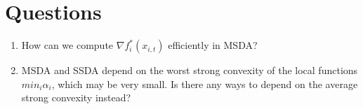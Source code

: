 \documentclass[12pt]{article}
\begin{document}
\section{Questions}
\begin{enumerate}
    \item How can we compute $\nabla f_{i}^{*}\left(x_{i, t}\right)$ efficiently in MSDA?
    \item MSDA and SSDA depend on the worst strong convexity of the local functions $min_i \alpha_i$, which may be very small. Is there any ways to depend on the average strong convexity instead? 
\end{enumerate}
\end{document}
